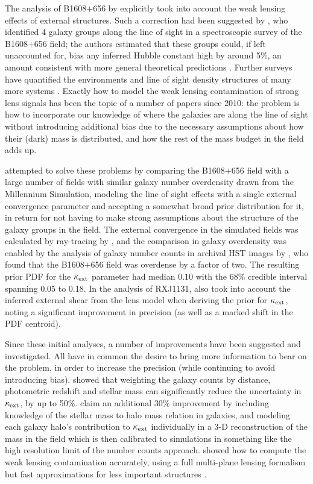 The analysis of B1608$+$656 by \citet{Suy++10} explicitly took into
account the weak lensing effects of external structures.  Such a
correction had been suggested by \citet{Fas++06b}, who identified 4
galaxy groups along the line of sight in a spectroscopic survey of the
B1608$+$656 field; the authors estimated that these groups could,
if left unaccounted
for, bias any inferred Hubble constant high by around 5\%, an amount
consistent with more general theoretical predictions \citep{Bar96,K+Z04}.
Further surveys have quantified the environments and line of sight
density structures of many more systems \citep{Mom++06,Aug++07,Won++11,Mom++15}.
Exactly how
to model the weak lensing contamination of strong lens signals
has been the topic of a number of papers since
2010: the problem is how to incorporate our knowledge of where the
galaxies are along the line of sight without introducing additional
bias due to the necessary assumptions about how their (dark) mass is
distributed, and how the rest of the mass budget in the field adds up.

\citet{Suy++10} attempted to solve these problems by comparing the
B1608$+$656 field with a large number of fields with similar  galaxy
number overdensity drawn from the Millennium Simulation, modeling the
line of sight effects with a single external convergence parameter and
accepting a somewhat broad prior distribution for it, in return for not
having to make  strong assumptions about the structure of the galaxy
groups in the field. The external convergence in the simulated fields
was calculated by ray-tracing by \citet{Hil++09}, and the
comparison in galaxy overdensity was enabled by the analysis of galaxy
number counts in archival HST images by \citet{FKW11}, who found that
the B1608$+$656 field was overdense by a factor of two. The resulting
prior PDF for the $\kappa_{\rm ext}$ parameter had median $0.10$ with
the 68\% credible interval spanning 0.05 to 0.18.
In the analysis of RXJ1131, \citet{Suy++13} also took into account the
inferred external shear from the lens model when deriving the prior for
$\kappa_{\rm ext}$, noting a significant improvement in precision (as
well as a marked shift in the PDF centroid).

Since these initial analyses, a number of improvements have been
suggested and investigated. All have in common the desire to bring more
information  to bear on the problem, in order to increase the precision
(while  continuing to avoid introducing bias). \citet{Gre++13} showed
that weighting the galaxy counts by distance, photometric redshift and
stellar mass  can significantly reduce the uncertainty in $\kappa_{\rm
ext}$, by up to 50\%. \citet{CollettEtal2013} claim an additional 30\%
improvement  by including knowledge of the stellar mass to halo mass
relation in galaxies,  and modeling each galaxy halo's contribution to
$\kappa_{\rm ext}$ individually in a  3-D reconstruction of the mass in
the field which is then calibrated to simulations in something like the
high resolution limit of the number counts approach.
\citet{McCullyEtal2014} showed how to compute the weak lensing
contamination accurately, using a full multi-plane lensing formalism
\cite[see also][]{Schneider2014}
but fast approximations for less important
structures \citep{McCullyEtal2016}.

